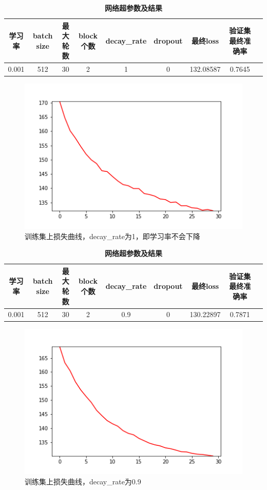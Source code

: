 \documentclass{article}
\begin{document}
	\begin{table}[!ht]
		\caption{\textbf{网络超参数及结果}}%
		\centering%
		\begin{tabular}{ccccccccc}
			\hline
			学习率    & batch size & 最大轮数 & block个数 & decay\_rate & dropout & 最终loss & 验证集最终准确率\\ \hline
			0.001 & 512    & 30  &  2  & 1 &0 & 132.08587  & 0.7645   \\ \hline
		\end{tabular}
	\end{table}
	\clearpage
	\begin{figure}[!ht]
		\centering %
		\includegraphics[scale=0.5]{runing-loss-9.png}
		\caption{训练集上损失曲线，decay\_rate为1，即学习率不会下降}
	\end{figure}
	
	\begin{table}[!ht]
		\caption{\textbf{网络超参数及结果}}%
		\centering%
		\begin{tabular}{ccccccccc}
			\hline
			学习率    & batch size & 最大轮数 & block个数 & decay\_rate & dropout & 最终loss & 验证集最终准确率\\ \hline
			0.001 & 512    & 30  &  2  & 0.9 &0 & 130.22897  & 0.7871   \\ \hline
		\end{tabular}
	\end{table}
	\begin{figure}[!ht]
		\centering %
		\includegraphics[scale=0.5]{runing-loss-4.png}
		\caption{训练集上损失曲线，decay\_rate为0.9}
	\end{figure}
	
\end{document}
